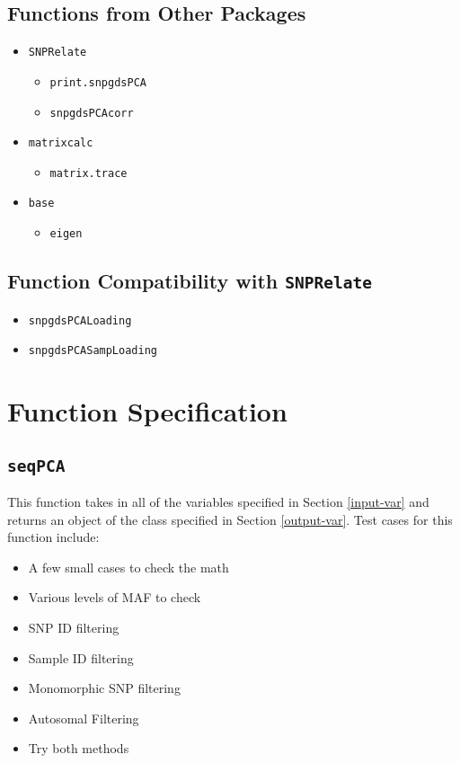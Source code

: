 \documentclass[11pt]{article}
\begin{document}
\subsection{Functions from Other Packages}
\begin{itemize}
	\item \texttt{SNPRelate}
	\begin{itemize}
		\item \texttt{print.snpgdsPCA}
		\item \texttt{snpgdsPCAcorr}
	\end{itemize}
	\item \texttt{matrixcalc}
	\begin{itemize}
		\item \texttt{matrix.trace}
	\end{itemize}
	\item \texttt{base}
		\begin{itemize}
			\item \texttt{eigen}
		\end{itemize}
\end{itemize}

\subsection{Function Compatibility with \texttt{SNPRelate}}
\begin{itemize}
	\item \texttt{snpgdsPCALoading}
	\item \texttt{snpgdsPCASampLoading}
\end{itemize}

\section{Function Specification}

\subsection{\texttt{seqPCA}}
This function takes in all of the variables specified in Section \ref{input-var} and returns an object of the class specified in Section \ref{output-var}. Test cases for this function include:
\begin{itemize}
\item A few small cases to check the math
\item Various levels of MAF to check
\item SNP ID filtering
\item Sample ID filtering
\item Monomorphic SNP filtering
\item Autosomal Filtering
\item Try both methods
\end{itemize}
\end{document}
